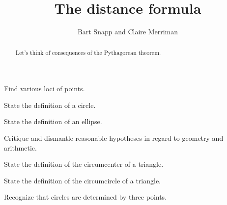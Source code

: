 \documentclass[nooutcomes,noauthor,handout]{../ximera}
\title{The distance formula}
\author{Bart Snapp and Claire Merriman}
\begin{document}
\begin{abstract}
  Let's think of consequences of the Pythagorean theorem.
\end{abstract}
\maketitle


\begin{listOutcomes}
\item Find various loci of points.
\item State the definition of a circle.
\item State the definition of an ellipse.
\item{Critique and dismantle reasonable hypotheses in regard to geometry and arithmetic.}
\item State the definition of the circumcenter of a triangle.
\item State the definition of the circumcircle of a triangle.
\item Recognize that circles are determined by three points.
\end{listOutcomes}


\mynewpage
\end{document}
